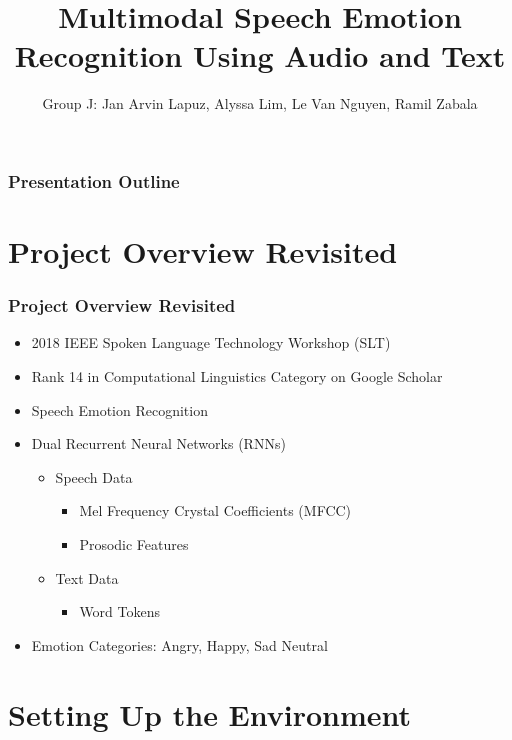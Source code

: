 \documentclass{beamer}
\title %
{Multimodal Speech Emotion Recognition Using Audio and Text}
\subtitle{}
\author[Group J] %
{Group J: Jan Arvin Lapuz, Alyssa Lim, Le Van Nguyen, Ramil Zabala}
\begin{document}
\frame{\titlepage}

\begin{frame}
\frametitle{Presentation Outline}
\tableofcontents
\end{frame}

\section{Project Overview Revisited}

\begin{frame}
\frametitle{Project Overview Revisited}
\begin{itemize}
    \item 2018 IEEE Spoken Language Technology Workshop (SLT)
    \item Rank 14 in Computational Linguistics Category on Google Scholar
    \item Speech Emotion Recognition
    \item Dual Recurrent Neural Networks (RNNs)
    \begin{itemize}
        \item Speech Data
            \begin{itemize}
                \item Mel Frequency Crystal Coefficients (MFCC)
                \item Prosodic Features
            \end{itemize}
        \item Text Data
            \begin{itemize}
                \item Word Tokens
            \end{itemize}
    \end{itemize}
    \item Emotion Categories: Angry, Happy, Sad Neutral
\end{itemize}
\end{frame}


\section{Setting Up the Environment}
\end{document}

